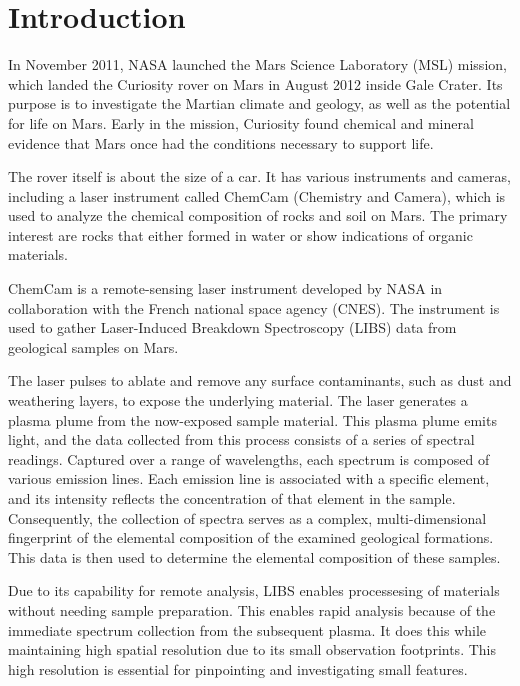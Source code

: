 \section{Introduction}\label{sec:introduction}
In November 2011, NASA launched the Mars Science Laboratory (MSL) mission, which landed the Curiosity rover on Mars in August 2012 inside Gale Crater. Its purpose is to investigate the Martian climate and geology, as well as the potential for life on Mars.
Early in the mission, Curiosity found chemical and mineral evidence that Mars once had the conditions necessary to support life.\cite{chemcamNasaWebsite}

The rover itself is about the size of a car.
It has various instruments and cameras, including a laser instrument called ChemCam (Chemistry and Camera), which is used to analyze the chemical composition of rocks and soil on Mars.
The primary interest are rocks that either formed in water or show indications of organic materials.\cite{chemcamNasaWebsite}

ChemCam is a remote-sensing laser instrument developed by NASA in collaboration with the French national space agency (CNES).
The instrument is used to gather Laser-Induced Breakdown Spectroscopy (LIBS) data from geological samples on Mars.

The laser pulses to ablate and remove any surface contaminants, such as dust and weathering layers, to expose the underlying material. The laser generates a plasma plume from the now-exposed sample material.
This plasma plume emits light, and the data collected from this process consists of a series of spectral readings. Captured over a range of wavelengths, each spectrum is composed of various emission lines. Each emission line is associated with a specific element, and its intensity reflects the concentration of that element in the sample.
Consequently, the collection of spectra serves as a complex, multi-dimensional fingerprint of the elemental composition of the examined geological formations.
This data is then used to determine the elemental composition of these samples.\cite{cleggRecalibrationMarsScience2017}

Due to its capability for remote analysis, LIBS enables processesing of materials without needing sample preparation. This enables rapid analysis because of the immediate spectrum collection from the subsequent plasma. It does this while maintaining high spatial resolution due to its small observation footprints. This high resolution is essential for pinpointing and investigating small features. \cite{wiensChemcam2012}

